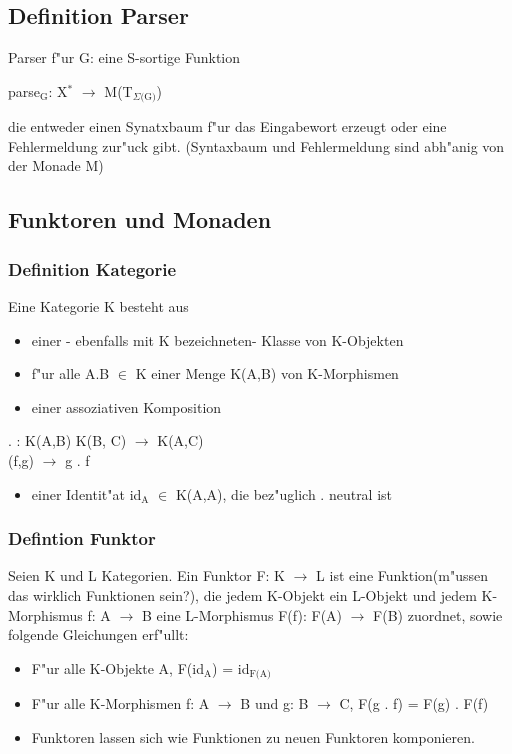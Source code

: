 \documentclass[11pt]{article}
\begin{document}
\subsection{Definition Parser}
\label{sec-5-1}

Parser f"ur G: eine S-sortige Funktion
\begin{center}
parse$_{\text{G}}$: X$^{\text{*}}$ $\to$ M(T$_{\Sigma\text{(G)}}$)
\end{center}
die entweder einen Synatxbaum f"ur das Eingabewort erzeugt oder eine Fehlermeldung zur"uck gibt. (Syntaxbaum und Fehlermeldung sind abh"anig von der Monade M)

\subsection{Funktoren und Monaden}
\label{sec-5-2}

\subsubsection{Definition Kategorie}
\label{sec-5-2-1}
Eine Kategorie K besteht aus
\begin{itemize}
\item einer - ebenfalls mit K bezeichneten- Klasse von K-Objekten
\item f"ur alle A.B $\in$ K einer Menge K(A,B) von K-Morphismen
\item einer assoziativen Komposition
\end{itemize}
\begin{center}
. : K(A,B) \texttimes{} K(B, C) $\to$ K(A,C) 
\\ (f,g) $\to$ g . f 
\end{center}
\begin{itemize}
\item einer Identit"at id$_{\text{A}}$ $\in$ K(A,A), die bez"uglich . neutral ist
\end{itemize}

\subsubsection{Defintion Funktor}
\label{sec-5-2-2}
Seien K und L Kategorien. Ein Funktor F: K $\to$ L ist eine Funktion(m"ussen das wirklich Funktionen sein?), die jedem K-Objekt ein L-Objekt und jedem 
K-Morphismus f: A $\to$ B eine L-Morphismus F(f): F(A) $\to$ F(B)  zuordnet, sowie folgende Gleichungen erf"ullt:
\begin{itemize}
\item F"ur alle K-Objekte A, F(id$_{\text{A}}$) = id$_{\text{F(A)}}$
\item F"ur alle K-Morphismen f: A $\to$ B und g: B $\to$ C, F(g . f) = F(g) . F(f)
\item Funktoren lassen sich wie Funktionen zu neuen Funktoren komponieren.
\end{itemize}
\end{document}
